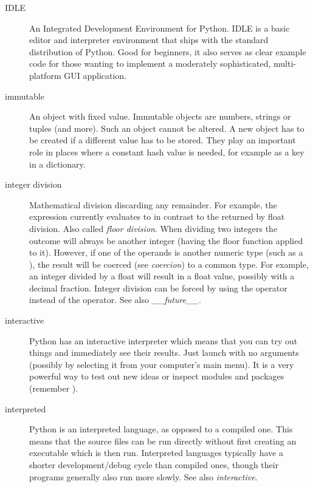 \begin{description}
\item[IDLE]
An Integrated Development Environment for Python.  IDLE is a
basic editor and interpreter environment that ships with the standard
distribution of Python.  Good for beginners, it also serves as clear
example code for those wanting to implement a moderately
sophisticated, multi-platform GUI application.

\item[immutable]
An object with fixed value.  Immutable objects are numbers, strings or
tuples (and more).  Such an object cannot be altered.  A new object
has to be created if a different value has to be stored.  They play an
important role in places where a constant hash value is needed, for
example as a key in a dictionary.

\item[integer division]
Mathematical division discarding any remainder.  For example, the
expression  currently evaluates to  in contrast
to the  returned by float division.  Also called
{}\emph{floor division}.  When dividing two integers the outcome will
always be another integer (having the floor function applied to it).
However, if one of the operands is another numeric type (such as a
{}), the result will be coerced (see \emph{coercion}) to
a common type.  For example, an integer divided by a float will result
in a float value, possibly with a decimal fraction.  Integer division
can be forced by using the \code{//} operator instead of the \code{/}
operator.  See also \emph{__future__}.

\item[interactive]
Python has an interactive interpreter which means that you can try out
things and immediately see their results.  Just launch  with no
arguments (possibly by selecting it from your computer's main menu).
It is a very powerful way to test out new ideas or inspect modules and
packages (remember ).

\item[interpreted]
Python is an interpreted language, as opposed to a compiled one.  This means
that the source files can be run directly without first creating an
executable which is then run.  Interpreted languages typically have a
shorter development/debug cycle than compiled ones, though their programs
generally also run more slowly.  See also {}\emph{interactive}.


\end{description}
